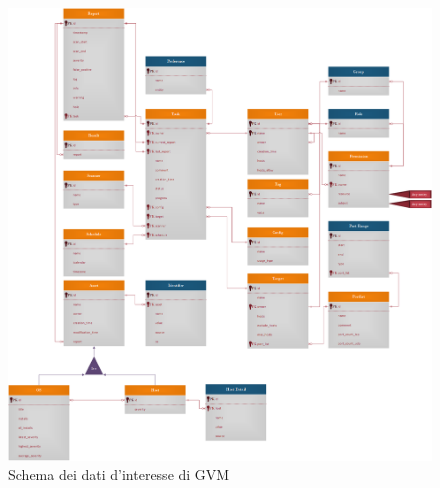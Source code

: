 \begin{figure}
    \includegraphics[width=\textwidth]{img/er_crow.png}
    \caption{Schema dei dati d'interesse di GVM}
    \label{er-crow}
\end{figure}


